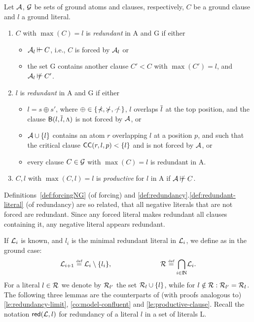\begin{DEFINITION}\label{def:redundancy}
Let $\mbox {$\cal A$}$, $\mbox {$\cal G$}$  be  sets of ground atoms and clauses, respectively, 
$C$ be a ground clause and $l$ a ground literal.
\begin{enumerate}\MyLPar%
\item \label{def:redundant-clauseNG}
  \(C\) with \(\max(C)=l\) is {\em redundant} in \C A and \C G if either
  \begin{itemize}%
  \item $\mathrel{\mbox {$\cal A$}_l \mathbin{\vdash\!\!\vdash} C}$, i.e., $C$ is forced by \(\mbox {$\cal A$}_l\)  or 
  \item the set \C G contains another clause \(C'<C\) with \(\max(C')=l\), and
    $\notforc{\C A_l}{C'}$.%
   \end{itemize}
\item \label {def:redundant-literal}
$l$ is {\em redundant} in \C A and \C G if either
  \begin{itemize}%
  \item \(l=s\oplus s'\), where \(\oplus \in \{\notIncl ,\notCont ,\notInt\}\),
  $l$ overlaps \(\overline{l}\) at the top position, and the clause \({\sf B}(l,\overline{l},\mbox{\footnotesize$\Lambda$})\) is not forced by \(\mbox {$\cal A$}\), or
  \item \(\mbox {$\cal A$}\cup\{l\}\) contains an atom $r$ overlapping $l$ at a position
  $p$, and such that the critical clause \({\sf CC}(r,l,p) <\{l\}\) and is not
  forced by \(\mbox {$\cal A$}\), or
  \item every clause $C\in \mbox {$\cal G$}$ with $\max(C)=l$ is redundant in \C A.
  \end{itemize}
\item \label{def:productiveNG}
\(C,l\) with \(\max(C,l)=l\) is {\em productive} for $l$
in \C A if $\notforc{\C A}C$. %
\end{enumerate}
 \end{DEFINITION}
\noindent
Definitions~\ref {def:forcingNG} (of forcing) and
\ref {def:redundancy}.\ref {def:redundant-literal} 
(of redundancy) are so related, that all negative literals that are
not forced are redundant. Since any forced literal makes redundant all
clauses containing it, any negative literal appears redundant.

If $\mbox {$\cal L$}_i$ is known, and \(l_i\) is the minimal redundant
literal in \(\mbox {$\cal L$}_i\), we define as in the ground case:
\begin{equation} \label{eq:atoms-modelNG}
\mbox {$\cal L$}_{i+1} \mathrel {\stackrel {\mbox {\tiny def}}{=}} \mbox {$\cal L$}_i \setminus \{l_i\}, \hspace{7em}
\mbox {$\cal R$} \mathrel {\stackrel {\mbox {\tiny def}}{=}}{\bigcap_{i\in {{\rm I\!N}}}} \mbox {$\cal L$}_i.
\end{equation}
%
For a literal \(l\in\mbox {$\cal R$}\) we denote by \(\mbox {$\cal R$}_{l'}\) the set \(\mbox {$\cal R$}_l\cup\{l\}\), while for \(l\notin\mbox {$\cal R$} :\mbox {$\cal R$}_{l'}=\mbox {$\cal R$}_l\).
The following three lemmas are the counterparts of (with proofs analogous to)
\ref{le:redundancy-limit}, 
\ref{co:model-confluent} and \ref{le:productive-clause}. Recall the notation
$\mbox{\sf red}(\mbox {$\cal L$},l)$ for redundancy of a literal $l$ in a set of literals \C L.

